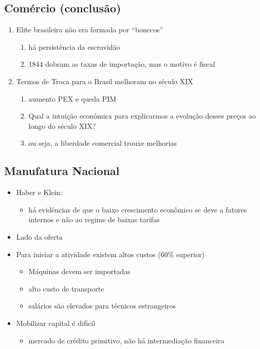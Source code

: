 \documentclass[a4paper,12pt]{article}[abntex2]
\begin{document}
\subsection{\textbf{Comércio (conclusão)}}
\begin{enumerate}
    \item Elite brasileira não era formada por “bonecos” 
    \begin{enumerate}
        \item há persistência da escravidão
        \item  1844 dobram as taxas de importação, mas o motivo é fiscal
    \end{enumerate}
    \item Termos de Troca para o Brasil melhoram no século XIX
    \begin{enumerate}
        \item aumento PEX e queda PIM
        \item Qual a intuição econômica para explicarmos a evolução desses preços ao longo do século XIX?
        \item  ou seja, a liberdade comercial trouxe melhorias
    \end{enumerate}
\end{enumerate}
\subsection{\textbf{Manufatura Nacional}}
\begin{itemize}
    \item Haber e Klein: 
    \begin{itemize}
        \item há evidências de que o baixo crescimento econômico se deve a fatores internos e não ao regime de baixas tarifas

    \end{itemize}
    \item Lado da oferta 
    \item Para iniciar a atividade existem altos custos (60\% superior)
    \begin{itemize}
        \item Máquinas devem ser importadas
        \item alto custo de transporte
        \item salários são elevados para técnicos estrangeiros
    \end{itemize}
    \item Mobilizar capital é difícil 
    \begin{itemize}
        \item mercado de crédito primitivo, não há intermediação financeira 
    \end{itemize}
\end{itemize}
\end{document}
